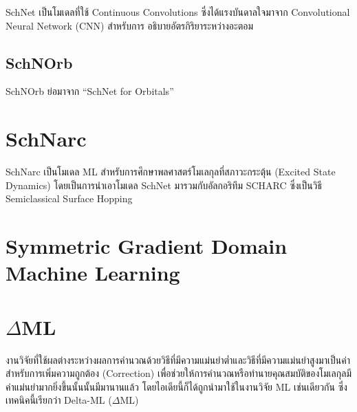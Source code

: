 SchNet เป็นโมเดลที่ใช้ Continuous Convolutions ซึ่งได้แรงบันดาลใจมาจาก Convolutional Neural Network (CNN) สำหรับการ%
อธิบายอัตรกิริยาระหว่างอะตอม\autocite{schutt2017,schutt2018}

\subsection{SchNOrb}
\label{ssec:schnorb}

SchNOrb ย่อมาจาก \enquote{SchNet for Orbitals}\autocite{schutt2019a}

\section{SchNarc}
\label{sec:schnarc}

SchNarc เป็นโมเดล ML สำหรับการศึกษาพลศาสตร์โมเลกุลที่สภาวะกระตุ้น (Excited State Dynamics)\autocite{westermayr2020} 
โดยเป็นการนำเอาโมเดล SchNet\autocite{schutt2017,schutt2018} มารวมกับอัลกอริทึม SCHARC\autocite{richter2011,mai2018} 
ซึ่งเป็นวิธี Semiclassical Surface Hopping

\section{Symmetric Gradient Domain Machine Learning}
\label{sec:sgdml}

\autocite{chmiela2017}

\autocite{chmiela2018}

\autocite{sauceda2020}

\autocite{chmiela2020}

\autocite{chmiela2022}

\section{\texorpdfstring{$\Delta$}-ML}
\label{sec:delta_ML}

งานวิจัยที่ใช้ผลต่างระหว่างผลการคำนวณด้วยวิธีที่มีความแม่นยำต่ำและวิธีที่มีความแม่นยำสูงมาเป็นค่าสำหรับการเพิ่มความถูกต้อง (Correction) 
เพื่อช่วยให้การคำนวณหรือทำนายคุณสมบัติของโมเลกุลมีค่าแม่นยำมากยิ่งขึ้นนั้นนั้นมีมานานแล้ว\autocite{hu2003,wu2007,balabin2009} 
โดยไอเดียนี้ก็ได้ถูกนำมาใช้ในงานวิจัย ML เช่นเดียวกัน ซึ่งเทคนิคนี้เรียกว่า Delta-ML ($\Delta$ML) 

